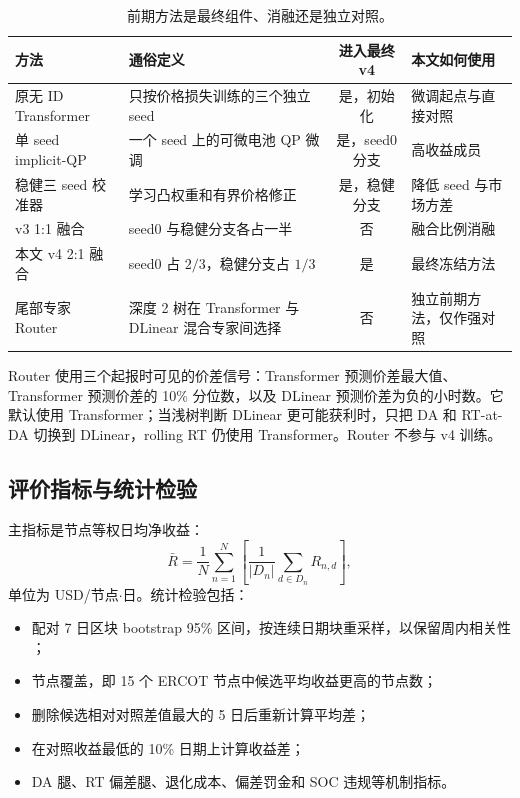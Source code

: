 \documentclass[UTF8,a4paper,11pt,fontset=fandol]{ctexart}
\newcommand{\usdnode}{USD/节点$\cdot$日}
\begin{document}
\begin{table}[H]
\centering
\caption{前期方法是最终组件、消融还是独立对照。}
\label{tab:internal}
\footnotesize
\begin{tabularx}{\textwidth}{l Y c Y}
\toprule
方法 & 通俗定义 & 进入最终 v4 & 本文如何使用 \\
\midrule
原无 ID Transformer & 只按价格损失训练的三个独立 seed & 是，初始化 & 微调起点与直接对照 \\
单 seed implicit-QP & 一个 seed 上的可微电池 QP 微调 & 是，seed0 分支 & 高收益成员 \\
稳健三 seed 校准器 & 学习凸权重和有界价格修正 & 是，稳健分支 & 降低 seed 与市场方差 \\
v3 1:1 融合 & seed0 与稳健分支各占一半 & 否 & 融合比例消融 \\
本文 v4 2:1 融合 & seed0 占 $2/3$，稳健分支占 $1/3$ & 是 & 最终冻结方法 \\
尾部专家 Router & 深度 2 树在 Transformer 与 DLinear 混合专家间选择 & 否 & 独立前期方法，仅作强对照 \\
\bottomrule
\end{tabularx}
\end{table}

Router 使用三个起报时可见的价差信号：Transformer 预测价差最大值、Transformer 预测价差的 10\% 分位数，以及 DLinear 预测价差为负的小时数。它默认使用 Transformer；当浅树判断 DLinear 更可能获利时，只把 DA 和 RT-at-DA 切换到 DLinear，rolling RT 仍使用 Transformer。Router 不参与 v4 训练。

\subsection{评价指标与统计检验}

主指标是节点等权日均净收益：
\begin{equation}
\bar R
=
\frac{1}{N}\sum_{n=1}^{N}
\left[
\frac{1}{|D_n|}
\sum_{d\in D_n}R_{n,d}
\right],
\end{equation}
单位为 \usdnode。统计检验包括：
\begin{itemize}
  \item 配对 7 日区块 bootstrap 95\% 区间，按连续日期块重采样，以保留周内相关性
  \cite{efron1993}；
  \item 节点覆盖，即 15 个 ERCOT 节点中候选平均收益更高的节点数；
  \item 删除候选相对对照差值最大的 5 日后重新计算平均差；
  \item 在对照收益最低的 10\% 日期上计算收益差；
  \item DA 腿、RT 偏差腿、退化成本、偏差罚金和 SOC 违规等机制指标。
\end{itemize}
\end{document}
